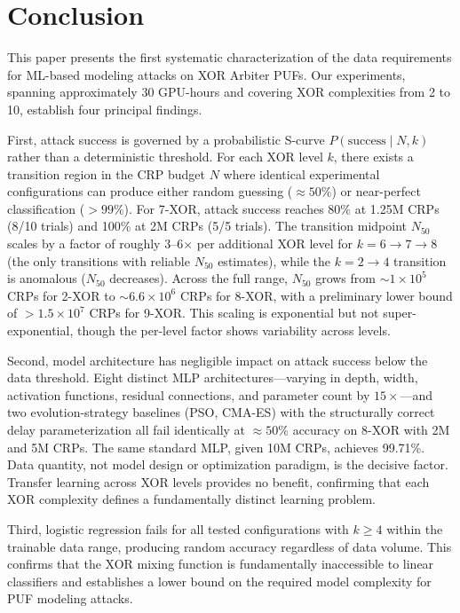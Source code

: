 \section{Conclusion}
\label{sec:conclusion}

This paper presents the first systematic characterization of the data
requirements for ML-based modeling attacks on XOR Arbiter PUFs.  Our
experiments, spanning approximately 30 GPU-hours and covering XOR
complexities from 2 to 10, establish four principal findings.

First, attack success is governed by a probabilistic S-curve
$P(\text{success} \mid N, k)$ rather than a deterministic threshold.  For each
XOR level $k$, there exists a transition region in the CRP budget $N$ where
identical experimental configurations can produce either random guessing
($\approx 50\%$) or near-perfect classification ($> 99\%$).  For 7-XOR,
attack success reaches 80\% at 1.25M CRPs (8/10 trials) and 100\% at 2M
CRPs (5/5 trials).  The transition
midpoint $N_{50}$ scales by a factor of roughly 3--6$\times$ per additional
XOR level for $k = 6\to7\to8$ (the only transitions with reliable $N_{50}$
estimates), while the $k=2\to4$ transition is anomalous ($N_{50}$
decreases).  Across the full range, $N_{50}$ grows from $\sim 1 \times
10^5$ CRPs for 2-XOR to $\sim 6.6 \times 10^6$ CRPs for 8-XOR, with a
preliminary lower bound of $>1.5\times10^7$ CRPs for 9-XOR.  This scaling is
exponential but not super-exponential, though the per-level factor shows
variability across levels.

Second, model architecture has negligible impact on attack success below the
data threshold.  Eight distinct MLP architectures---varying in depth, width,
activation functions, residual connections, and parameter count by
$15\times$---and two evolution-strategy baselines (PSO, CMA-ES) with the
structurally correct delay parameterization all fail identically at
$\approx 50\%$ accuracy on 8-XOR with 2M and 5M CRPs.  The same standard MLP,
given 10M CRPs, achieves 99.71\%.  Data quantity,
not model design or optimization paradigm, is the decisive factor.
Transfer learning across XOR levels provides no benefit, confirming that each
XOR complexity defines a fundamentally distinct learning problem.

Third, logistic regression fails for all tested configurations with $k \geq 4$
within the trainable data range, producing random accuracy regardless of data
volume.  This confirms that the
XOR mixing function is fundamentally inaccessible to linear classifiers and
establishes a lower bound on the required model complexity for PUF modeling
attacks.

